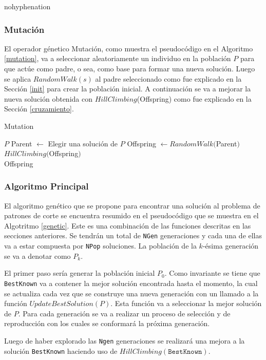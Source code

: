 \documentclass[a4paper,10pt,twocolumn]{article}
\begin{document}
\begin{hyphenrules}{nohyphenation}
\subsubsection{Mutación}

El operador génetico Mutación, como muestra el pseudocódigo en el Algoritmo 	\ref{mutation}, va a seleccionar aleatoriamente un individuo en la población $P$ para que actúe como padre, o sea, como base para formar una nueva solución. Luego se aplica $RandomWalk(s)$ al padre seleccionado como fue explicado en la Sección \ref{init} para crear la población inicial. A continuación se va a mejorar la nueva solución obtenida con $HillClimbing$(Offspring) como fue explicado en la Sección \ref{cruzamiento}.  


\algrenewcommand{}
\begin{algorithm}
	\caption{Mutation}\label{mutation}
	\begin{algorithmic}[1]
		\Require $P$
		\State Parent $\gets $ Elegir una solución de $P$
		\State Offspring $\gets RandomWalk($Parent$)$
		\State $ HillClimbing($Offspring$)$\\
		\Return Offspring 
	\end{algorithmic}
\end{algorithm}


\subsubsection{Algoritmo Principal}
El algoritmo genético que se propone para encontrar una solución al problema de patrones de corte se encuentra resumido en el pseudocódigo que se muestra en el Algotritmo \ref{genetic}. Este es una combinación de las funciones descritas en las secciones anteriores. Se tendrán un total de \texttt{NGen} generaciones y cada una de ellas va a estar compuesta por \texttt{NPop} soluciones. La población de la $k$-ésima generación se va a denotar como $P_k$.

El primer paso sería generar la población inicial $P_0$. Como invariante se tiene que \texttt{BestKnown} va a contener la mejor solución encontrada hasta el momento, la cual se actualiza cada vez que se construye una nueva generación con un llamado a la función $UpdateBestSolution(P)$. Esta función va a seleccionar la mejor solución de $P$. Para cada generación se va a realizar un proceso de selección y de reproducción con los cuales se conformará la próxima generación.

Luego de haber explorado las \texttt{Ngen} generaciones se realizará una mejora a la solución \texttt{BestKnown} haciendo uso de $HillClimbing(\mathtt{BestKnown})$.
 

\end{hyphenrules}
\end{document}
